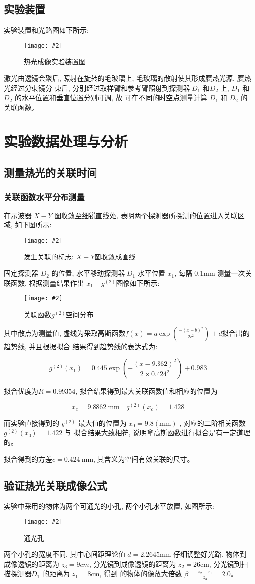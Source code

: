 \documentclass[12pt,a4paper]{article}
\newcommand{\be}[1]{
    \begin{equation}
        #1
    \end{equation}
}
\newcommand{\bfig}[3]{
    \begin{figure}[H]
        \centering
        \texttt{[image: \#2]}
        \caption{#3}
    \end{figure}
}
\begin{document}
\subsection{实验装置}
实验装置和光路图如下所示:
\bfig{0.8}{热光成像实验装置图.png}{热光成像实验装置图}
激光由透镜会聚后, 照射在旋转的毛玻璃上, 毛玻璃的散射使其形成赝热光源, 赝热光经过分束镜分
束后, 分别经过取样臂和参考臂照射到探测器 $D_1$ 和$ D_2$ 上, $D_1$ 和 $D_2$ 的水平位置和垂直位置分别可调, 故
可在不同的时空点测量计算 $D_1$ 和 $D_2$ 的关联函数。
\section{实验数据处理与分析}
\subsection{测量热光的关联时间}
\subsubsection{关联函数水平分布测量}
在示波器 $X − Y$ 图收敛至细锐直线处, 表明两个探测器所探测的位置进入关联区域, 如下图所示: 
\bfig{0.5}{x-y图.jpg}{发生关联的标志: $X-Y$图收敛成直线}
固定探测器 $D_2$ 的位置, 水平移动探测器 $D_1$ 水平位置 $x_1$, 每隔
0.1mm 测量一次关联函数, 根据测量结果作出 $x_1 − g^{(2)}$图像如下所示:
\bfig{0.5}{空间关联.png}{关联函数$g^{(2)}$空间分布}
其中散点为测量值, 虚线为采取高斯函数$f(x)=a \exp \left(\frac{-\left(x-b\right)^{2}}{2 c^{2}}\right)+d$拟合出的趋势线, 并且根据拟合
结果得到趋势线的表达式为:
\be{g^{(2)}(x_1)= 0.445 \exp{(-\frac{(x-9.862)^2}{2 \times  0.424^2})}+0.983}
拟合优度为$R=0.99354$, 拟合结果得到最大关联函数值和相应的位置为
\be{x_{c}=9.8862\mathrm{~mm} \quad g^{(2)}\left(x_{c}\right)=1.428}
而实验直接得到的 $g^{(2)}$ 最大值的位置为 $x_0 = 9.8(\mathrm{mm})$ , 对应的二阶相关函数 $g^{(2)}(x_0) = 1.422$ 与
拟合结果大致相符, 说明拿高斯函数进行拟合是有一定道理的。

拟合得到的方差$c=0.424 \mathrm{~mm}$, 其含义为空间有效关联的尺寸。
\subsection{验证热光关联成像公式}
实验中采用的物体为两个可通光的小孔, 两个小孔水平放置, 如图所示:
\bfig{0.4}{通光孔.jpg}{通光孔}
两个小孔的宽度不同, 其中心间距理论值 $d = 2.2645\mathrm{mm}$ 仔细调整好光路, 物体到成像透镜的距离为
$z_3 = 9cm$, 分光镜到成像透镜的距离为 $z_2 = 26\mathrm{cm}$, 分光镜到扫描探测器$ D_1$ 的距离为 $z_1 = 8\mathrm{cm}$, 得到
的物体的像放大倍数 $\beta =\frac{z_2 − z_1}{z_3}= 2.0$。
\end{document}
